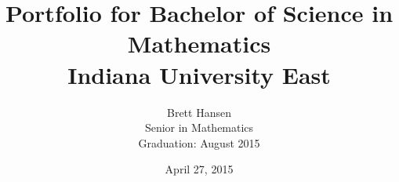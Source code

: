 \documentclass{article}
\begin{document}
\newtheorem{theorem}{Theorem}[section]
\newtheorem{lemma}[theorem]{Lemma}
\newtheorem{proposition}[theorem]{Proposition}
\newtheorem{corollary}[theorem]{Corollary}
\newtheorem{definition}[theorem]{Definition}
\newtheorem{example}[theorem]{Example}

\title{Portfolio for Bachelor of Science in Mathematics\\ Indiana University East}
\date{April 27, 2015}
\author{Brett Hansen\\ Senior in Mathematics\\ Graduation: August 2015}
\maketitle

\vfill\pagebreak

\tableofcontents

\vfill\pagebreak



\vfill\pagebreak



\vfill\pagebreak



\vfill\pagebreak



\vfill\pagebreak



\vfill\pagebreak



\vfill\pagebreak



\vfill\pagebreak



\vfill\pagebreak



\vfill\pagebreak


\end{document}
